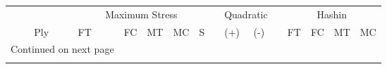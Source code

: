 \begin{table}[H]
\centering
\begin{longtable}{@{}rllllllllllllll@{}}
\toprule       
 & \phantom{a} &\multicolumn{5}{c}{Maximum Stress} & \phantom{a} & \multicolumn{2}{c}{Quadratic} & 
\phantom{a} & \multicolumn{4}{c}{Hashin}\\
\cmidrule{3-7} \cmidrule{9-10} \cmidrule{12-15}
  
         Ply &&  FT &  FC &  MT &  MC &      S &&  (+) &   (-) &&  FT &  FC &  MT &  MC \\
\midrule
\endhead
\midrule
\multicolumn{3}{r}{{Continued on next page}} \\
\midrule
\endfoot


\end{longtable}
\end{table}
